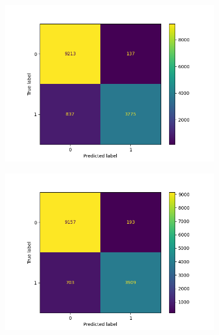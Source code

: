 \begin{figure}
\begin{subfigure}[b]{0.245\textwidth}
            \centering 
            \includegraphics[scale=0.35]{"../figs/fig_content_title/fig_TFIDF_LogisticRegression(solver='sag')__content_title.png"}
            \caption{}
        \end{subfigure}
        \begin{subfigure}[b]{0.245\textwidth}
            \centering
            \includegraphics[scale=0.35]{"../figs/fig_content_title/fig_TFIDF_SVC(kernel='linear')__content_title.png"}
            \caption{}
        \end{subfigure}
        \begin{subfigure}[b]{0.245\textwidth}  
            \centering 

\end{subfigure}
\end{figure}
